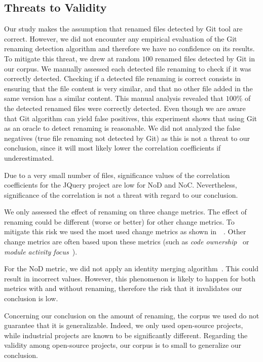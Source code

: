 \subsection{Threats to Validity}
\label{sec:threats}

Our study makes the assumption that renamed files detected by Git tool are correct. However, we did not encounter any empirical evaluation of the Git renaming detection algorithm and therefore we have no confidence on its results. To mitigate this threat, we drew at random $100$ renamed files detected by Git in our corpus. We manually assessed each detected file renaming to check if it was correctly detected. Checking if a detected file renaming is correct consists in ensuring that the file content is very similar, and that no other file added in the same version has a similar content. This manual analysis revealed that $100\%$ of the detected renamed files were correctly detected. Even though we are aware that Git algorithm can yield false positives, this experiment shows that using Git as an oracle to detect renaming is reasonable. We did not analyzed the false negatives (true file renaming not detected by Git) as this is not a threat to our conclusion, since it will most likely lower the correlation coefficients if underestimated.

Due to a very small number of files, significance values of the correlation coefficients for the JQuery project are low for NoD and NoC. Nevertheless, significance of the correlation is not a threat with regard to our conclusion.

We only assessed the effect of renaming on three change metrics. The effect of renaming could be different (worse or better) for other change metrics. To mitigate this risk we used the most used change metrics as shown in~~\cite{radjenovic_software_2013}. Other change metrics are often based upon these metrics (such as \emph{code ownership}~\cite{bird_dont_2011} or \emph{module activity focus}~\cite{posnett_dual_2013}).

For the NoD metric, we did not apply an identity merging algorithm~\cite{goeminne_comparison_2013}. This could result in incorrect values. However, this phenomenon is likely to happen for both metrics with and without renaming, therefore the risk that it invalidates our conclusion is low.

Concerning our conclusion on the amount of renaming, the corpus we used do not guarantee that it is generalizable. Indeed, we only used open-source projects, while industrial projects are known to be significantly different. Regarding the validity among open-source projects, our corpus is to small to generalize our conclusion.
